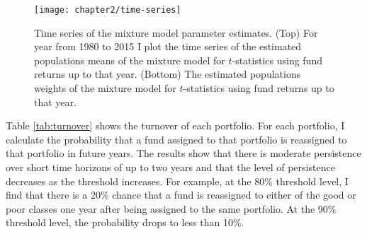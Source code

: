 		\begin{figure}[t]
			\small
			\centering
			\texttt{[image: chapter2/time-series]}
			\captionsetup{skip=-20pt, font=footnotesize, justification=justified, width=\textwidth}
			\caption[Time series of the mixture model parameter estimates]{Time series of the mixture model parameter estimates. (Top) For year from 1980 to 2015 I plot the time series of the estimated populations means of the mixture model for $t$-statistics using fund returns up to that year. (Bottom) The estimated populations weights of the mixture model for $t$-statistics using fund returns up to that year.}
			\label{fig:estimates}
		\end{figure}

		Table \ref{tab:turnover} shows the turnover of each portfolio.  For each portfolio, I calculate the probability that a fund assigned to that portfolio is reassigned to that portfolio in future years.  The results show that there is moderate persistence over short time horizons of up to two years and that the level of persistence decreases as the threshold increases. For example, at the 80\% threshold level, I find that there is a 20\% chance that a fund is reassigned to either of the good or poor classes one year after being assigned to the same portfolio.  At the 90\% threshold level, the probability drops to less than 10\%.

